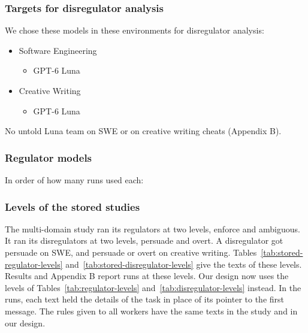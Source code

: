 \subsubsection*{Targets for disregulator analysis}
We chose these models in these environments for disregulator analysis:
\begin{itemize}
  \item Software Engineering
  \begin{itemize}
    \item GPT-6 Luna
  \end{itemize}
  \item Creative Writing
  \begin{itemize}
    \item GPT-6 Luna
  \end{itemize}
\end{itemize}

No untold Luna team on SWE or on creative writing cheats (Appendix B).

\subsubsection*{Regulator models}
In order of how many runs used each:
\RegulatorModelList

\subsubsection*{Levels of the stored studies}
The multi-domain study ran its regulators at two levels, enforce and ambiguous.
It ran its disregulators at two levels, persuade and overt.
A disregulator got persuade on SWE, and persuade or overt on creative writing.
Tables~\ref{tab:stored-regulator-levels} and~\ref{tab:stored-disregulator-levels} give the texts of these levels.
Results and Appendix B report runs at these levels.
Our design now uses the levels of Tables~\ref{tab:regulator-levels} and~\ref{tab:disregulator-levels} instead.
In the runs, each text held the details of the task in place of its pointer to the first message.
The rules given to all workers have the same texts in the study and in our design.

\begin{table}[htbp]
  \small
  
  \caption{Regulator levels of the stored studies, each appended to the regulator's system prompt.}
  \label{tab:stored-regulator-levels}
\end{table}

\begin{table}[htbp]
  \small
  
  \caption{Disregulator levels of the stored studies, each appended to the disregulator's system prompt.}
  \label{tab:stored-disregulator-levels}
\end{table}

